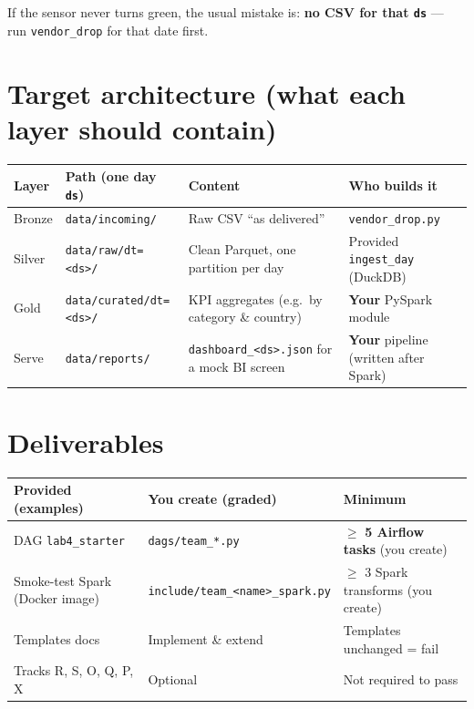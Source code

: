 \documentclass[11pt,a4paper]{article}
\begin{document}
If the sensor never turns green, the usual mistake is: \textbf{no CSV for that \texttt{ds}} --- run \texttt{vendor\_drop} for that date first.

\section*{Target architecture (what each layer should contain)}
\label{sec:arch}

\begin{center}
\small
\renewcommand{\arraystretch}{1.25}
\begin{tabular}{@{} l l p{5.2cm} p{3.8cm} @{}}
\toprule
\textbf{Layer} & \textbf{Path (one day \texttt{ds})} & \textbf{Content} & \textbf{Who builds it} \\
\midrule
Bronze & \texttt{data/incoming/} & Raw CSV ``as delivered'' & \texttt{vendor\_drop.py} \\
Silver & \texttt{data/raw/dt=<ds>/} & Clean Parquet, one partition per day & Provided \texttt{ingest\_day} (DuckDB) \\
Gold & \texttt{data/curated/dt=<ds>/} & KPI aggregates (e.g.\ by category \& country) & \textbf{Your} PySpark module \\
Serve & \texttt{data/reports/} & \texttt{dashboard\_<ds>.json} for a mock BI screen & \textbf{Your} pipeline (written after Spark) \\
\bottomrule
\end{tabular}
\end{center}

\section*{Deliverables}
\label{sec:create}

\begin{center}
\renewcommand{\arraystretch}{1.3}
\begin{tabular}{@{} l l l @{}}
\toprule
\textbf{Provided (examples)} & \textbf{You create (graded)} & \textbf{Minimum} \\
\midrule
DAG \texttt{lab4\_starter} & \texttt{dags/team\_*.py} & $\geq$ \textbf{5 Airflow tasks} (you create) \\
Smoke-test Spark (Docker image) & \texttt{include/team\_<name>\_spark.py} & $\geq$ 3 Spark transforms (you create) \\
Templates docs & Implement \& extend & Templates unchanged = fail \\
Tracks R, S, O, Q, P, X & Optional & Not required to pass \\
\bottomrule
\end{tabular}
\end{center}
\end{document}
